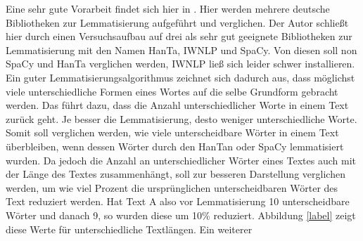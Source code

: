 Eine sehr gute Vorarbeit findet sich hier in \cite{lemma}. Hier werden mehrere deutsche Bibliotheken zur Lemmatisierung aufgeführt und verglichen. Der Autor schließt hier durch einen Versuchsaufbau auf drei als sehr gut geeignete Bibliotheken zur Lemmatisierung mit den Namen HanTa, IWNLP  und SpaCy. Von diesen soll non SpaCy und HanTa verglichen werden, IWNLP ließ sich leider schwer installieren.\\ \newline
Ein guter Lemmatisierungsalgorithmus zeichnet sich dadurch aus, dass möglichst viele unterschiedliche Formen eines Wortes auf die selbe Grundform gebracht werden. Das führt dazu, dass die Anzahl unterschiedlicher Worte in einem Text zurück geht. Je besser die Lemmatisierung, desto weniger unterschiedliche Worte. Somit soll verglichen werden, wie viele unterscheidbare Wörter in einem Text überbleiben, wenn dessen Wörter durch den HanTan oder SpaCy lemmatisiert wurden. Da jedoch die Anzahl an unterschiedlicher Wörter eines Textes auch mit der Länge des Textes zusammenhängt, soll zur besseren Darstellung verglichen werden, um wie viel Prozent die ursprünglichen unterscheidbaren Wörter des Text reduziert werden. Hat Text A also vor Lemmatisierung 10 unterscheidbare Wörter und danach 9, so wurden diese um 10\% reduziert. Abbildung \ref{label} zeigt diese Werte für unterschiedliche Textlängen. Ein weiterer 




